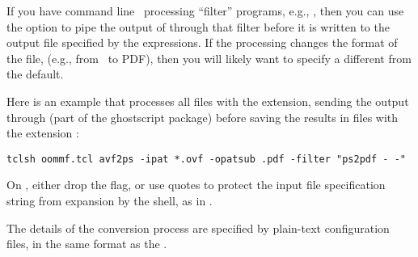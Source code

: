 If you have command line \postscript\ processing ``filter'' programs,
e.g., , then you can
use the  option to pipe the output of  through
that filter before it is written to the output file specified by the
 expressions.  If the processing changes the format of the
file, (e.g., from \postscript\ to PDF), then you will
likely want to specify a  different from the default.

Here is an example that processes all files with the 
extension, sending the output through  (part of the
ghostscript package) before saving the results in files with the
extension :
\begin{verbatim}
tclsh oommf.tcl avf2ps -ipat *.ovf -opatsub .pdf -filter "ps2pdf - -"
\end{verbatim}
On \Unix, either drop the  flag, or use quotes to protect
the input file specification string from expansion by the shell, as in
.

The details of the conversion process are specified by plain-text
configuration files, in the same format as the
.

